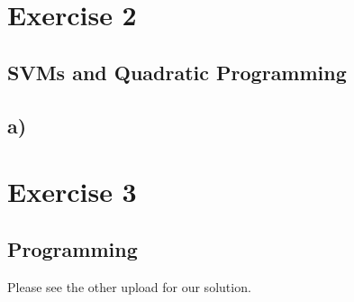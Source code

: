 \documentclass{article}
\begin{document}
\section*{Exercise 2}

\subsection*{SVMs and Quadratic Programming}

\subsection*{a)}


\section*{Exercise 3}

\subsection*{Programming}

Please see the other upload for our solution.
\end{document}
